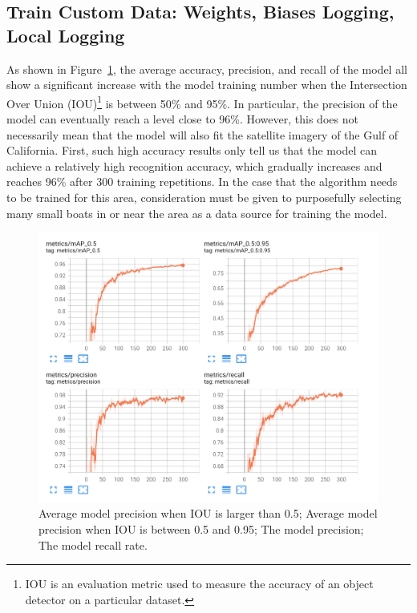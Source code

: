 \subsection{Train Custom Data: Weights, Biases Logging, Local Logging}

As shown in Figure~\ref{fig:colab_metrics}, the average accuracy, precision, and recall of the model all show a significant increase with the model training number when the Intersection Over Union (IOU)\footnote{IOU is an evaluation metric used to measure the accuracy of an object detector on a particular dataset.} is between 50\% and 95\%. In particular, the precision of the model can eventually reach a level close to 96\%. However, this does not necessarily mean that the model will also fit the satellite imagery of the Gulf of California. First, such high accuracy results only tell us that the model can achieve a relatively high recognition accuracy, which gradually increases and reaches 96\% after 300 training repetitions. In the case that the algorithm needs to be trained for this area, consideration must be given to purposefully selecting many small boats in or near the area as a data source for training the model. 

\begin{figure}[!t]
    \centerline{\includegraphics[width=\columnwidth]{img/colab_metrics.png}}
    \caption{Average model precision when IOU is larger than 0.5; Average model precision when IOU is between 0.5 and 0.95; The model precision; The model recall rate.}
    \label{fig:colab_metrics}
\end{figure}

